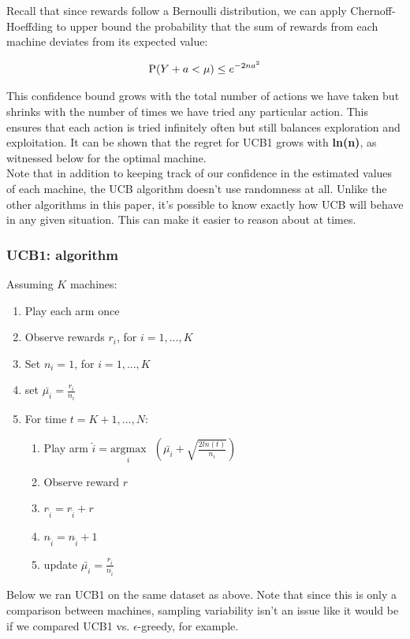 \documentclass{article}
\begin{document}
Recall that since rewards follow a Bernoulli distribution, we can apply Chernoff-Hoeffding to upper bound the probability that the sum of rewards from each machine deviates from its expected value:

$$\displaystyle \textup{P}(Y + a < \mu) \leq e^{-2na^2}$$

This confidence bound grows with the total number of actions we have taken but shrinks with the number of times we have tried any particular action. This ensures that each action is tried infinitely often but still balances exploration and exploitation. It can be shown that the regret for UCB1 grows with \textbf{ln(n)}, as witnessed below for the optimal machine.\\

Note that in addition to keeping track of our confidence in the estimated values of each machine, the UCB algorithm doesn't use randomness at all. Unlike the other algorithms in this paper, it's possible to know exactly how UCB will behave in any given situation. This can make it easier to reason about at times.

\subsubsection{UCB1: algorithm}

Assuming $K$ machines:

\begin{enumerate}
\item Play each arm once
\item Observe rewards $r_i$, for $i = 1, ..., K$
\item Set $n_i = 1$, for $i = 1, ..., K$
\item set $\bar{\mu_{i}} = \frac{r_i}{n_i}$
\item For time $t = K+1, ..., N$:
	\begin{enumerate}
		\item Play arm $\hat{i} = \underset{i}{\text{argmax}}\text{ }(\bar{\mu_{i}} + \sqrt{\frac{2 ln (t)}{n_i}})$
		\item Observe reward $r$
		\item $r_{\hat{i}} = r_{\hat{i}} + r$
		\item $n_{\hat{i}} = n_{\hat{i}} + 1$
		\item update $\bar{\mu_{i}} = \frac{r_{\hat{i}}}{n_{\hat{i}}}$
	\end{enumerate}
\end{enumerate}

Below we ran UCB1 on the same dataset as above. Note that since this is only a comparison between machines, sampling variability isn't an issue like it would be if we compared UCB1 vs. $\epsilon$-greedy, for example.
\end{document}
